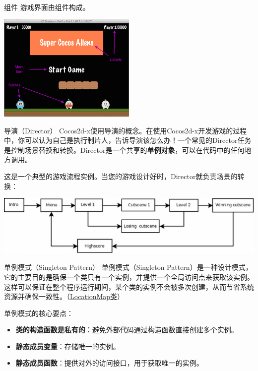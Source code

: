 \documentclass{beamer}
\newcommand{\hrefcol}[2]{\textcolor{cyan}{\href{#1}{#2}}}
\begin{document}
\begin{frame}[fragile]{组件}
游戏界面由组件构成。

\vspace{1em}

\includegraphics[width=0.5\textwidth]
{figures/components}
\end{frame}


\begin{frame}[fragile]{导演（Director）}
Cocos2d-x使用导演的概念。在使用Cocos2d-x开发游戏的过程中，你可以认为自己是执行制片人，告诉导演该怎么办！一个常见的Director任务是控制场景替换和转换。Director是一个共享的\textbf{单例对象}，可以在代码中的任何地方调用。

\vspace{1em}

这是一个典型的游戏流程实例。当您的游戏设计好时，Director就负责场景的转换：

\vspace{1em}

\includegraphics[width=\textwidth]
{figures/director}
\end{frame}


\begin{frame}[fragile]{单例模式（Singleton Pattern）}
单例模式（Singleton Pattern）是一种设计模式，它的主要目的是确保一个类只有一个实例，并提供一个全局访问点来获取该实例。这样可以保证在整个程序运行期间，某个类的实例不会被多次创建，从而节省系统资源并确保一致性。（\hrefcol{https://github.com/MinmusLin/Teamfight_Tactics/tree/main/Classes/LocationMap}{LocationMap类}）

\vspace{1em}

单例模式的核心要点：
\begin{itemize}
\item \textbf{类的构造函数是私有的}：避免外部代码通过构造函数直接创建多个实例。
\item \textbf{静态成员变量}：存储唯一的实例。
\item \textbf{静态成员函数}：提供对外的访问接口，用于获取唯一的实例。
\end{itemize}
\end{frame}
\end{document}
